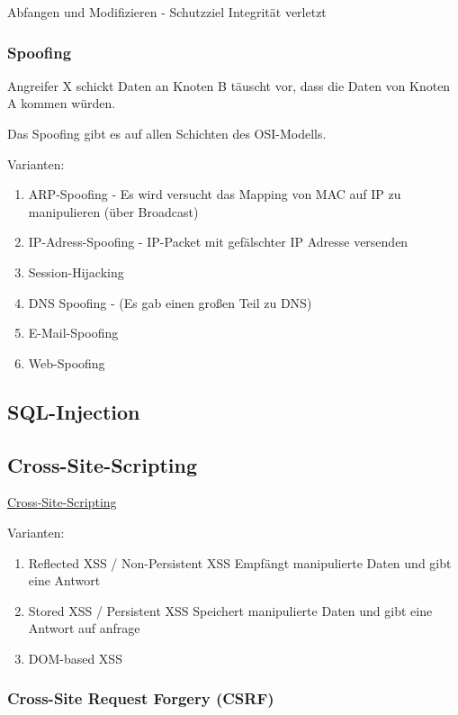 \documentclass[a4paper]{article}
\begin{document}
Abfangen und Modifizieren - Schutzziel Integrität verletzt

\subsubsection{Spoofing}

Angreifer X schickt Daten an Knoten B täuscht vor, dass die Daten von Knoten A kommen würden.

Das Spoofing gibt es auf allen Schichten des OSI-Modells.

Varianten:

\begin{enumerate}
    \item ARP-Spoofing - Es wird versucht das Mapping von MAC auf IP zu manipulieren (über Broadcast)
    \item IP-Adress-Spoofing - IP-Packet mit gefälschter IP Adresse versenden
    \item Session-Hijacking
    \item DNS Spoofing - (Es gab einen großen Teil zu DNS)
    \item E-Mail-Spoofing
    \item Web-Spoofing
\end{enumerate}

\subsection{SQL-Injection}



\subsection{Cross-Site-Scripting}

\href{https://cwe.mitre.org/data/definitions/79.html}{Cross-Site-Scripting}

Varianten:

\begin{enumerate}
    \item Reflected XSS / Non-Persistent XSS
    Empfängt manipulierte Daten und gibt eine Antwort
    \item Stored XSS / Persistent XSS
    Speichert manipulierte Daten und gibt eine Antwort auf anfrage
    \item DOM-based XSS
\end{enumerate}

\subsubsection{Cross-Site Request Forgery (CSRF)}
\end{document}
